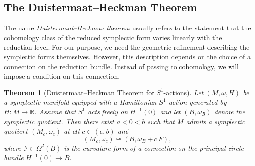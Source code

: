 \documentclass[10pt,oneside,reqno]{amsart}
\newtheorem{theorem}{Theorem}[section]
\theoremstyle{definition}
\newcommand{\IR}{\mathbb{R}}
\begin{document}
\subsection{The Duistermaat--Heckman Theorem}
The name \emph{Duistermaat--Heckman theorem} usually refers to the statement that the cohomology class of the reduced symplectic form varies linearly with the reduction level. For our purpose, we need the geometric refinement describing the symplectic forms themselves. However, this description depends on the choice of a connection on the reduction bundle. Instead of passing to cohomology, we will impose a condition on this connection. 
\begin{theorem}[Duistermaat--Heckman Theorem for $S^1$-actions]
    Let $(M,\omega,H)$ be a symplectic manifold equipped with a Hamiltonian $S^1$-action generated by $H:M\to \IR$. Assume that $S^1$ acts freely on $H^{-1}(0)$ and let $(B,\omega_B)$ denote the symplectic quotient. Then there exist $a<0<b$ such that $M$ admits a symplectic quotient $(M_c,\omega_c)$ at all $c\in (a,b)$ and $$(M_c,\omega_c)\cong (B,\omega_B + c\, F),$$ where $F\in \Omega^2(B)$ is the curvature form of a connection on the principal circle bundle $H^{-1}(0) \to B.$
\end{theorem}
\end{document}
